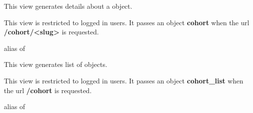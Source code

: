 \documentclass[letterpaper,10pt,english]{sphinxmanual}
\begin{document}

\begin{fulllineitems}
\label{data:mousedb.data.views.CohortDetail}
This view generates details about a {\hyperref[data:mousedb.data.models.Cohort]{}} object.

This view is restricted to logged in users.
It passes an object \textbf{cohort} when the url \textbf{/cohort/\textless{}slug\textgreater{}} is requested.

\begin{fulllineitems}
\label{data:mousedb.data.views.CohortDetail.model}
alias of 

\end{fulllineitems}


\end{fulllineitems}


\begin{fulllineitems}
\label{data:mousedb.data.views.CohortList}
This view generates list of {\hyperref[data:mousedb.data.models.Cohort]{}} objects.

This view is restricted to logged in users.
It passes an object \textbf{cohort\_list} when the url \textbf{/cohort} is requested.

\begin{fulllineitems}
\label{data:mousedb.data.views.CohortList.model}
alias of 

\end{fulllineitems}


\end{fulllineitems}

\end{document}
